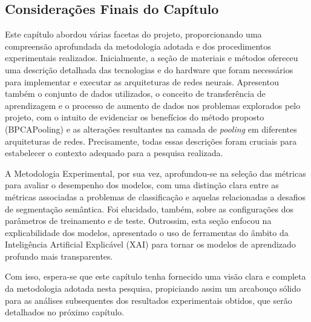 

\subsection{Considerações Finais do Capítulo}
\label{project:final}
 Este capítulo abordou várias facetas do projeto, proporcionando uma compreensão aprofundada da metodologia adotada e dos procedimentos experimentais realizados. Inicialmente, a seção de materiais e métodos ofereceu uma descrição detalhada das tecnologias e do hardware que foram necessários para implementar e executar as arquiteturas de redes neurais. Apresentou também o conjunto de dados utilizados, o conceito de transferência de aprendizagem e o processo de aumento de dados nos problemas explorados pelo projeto, com o intuito de evidenciar os benefícios do método proposto (BPCAPooling) e as alterações resultantes na camada de \textit{pooling} em diferentes arquiteturas de redes. Precisamente, todas essas descrições foram cruciais para estabelecer o contexto adequado para a pesquisa realizada.

A Metodologia Experimental, por sua vez, aprofundou-se na seleção das métricas para avaliar o desempenho dos modelos, com uma distinção clara entre as métricas associadas a problemas de classificação e aquelas relacionadas a desafios de segmentação semântica. Foi elucidado, também, sobre as configurações dos parâmetros de treinamento e de teste. Outrossim, esta seção enfocou na explicabilidade dos modelos, apresentado o uso de ferramentas do âmbito da Inteligência Artificial Explicável (XAI) para tornar os modelos de aprendizado profundo mais transparentes.


Com isso, espera-se que este capítulo tenha fornecido uma visão clara e completa da metodologia adotada nesta pesquisa, propiciando assim um arcabouço sólido para as análises subsequentes dos resultados experimentais obtidos, que serão detalhados no próximo capítulo.